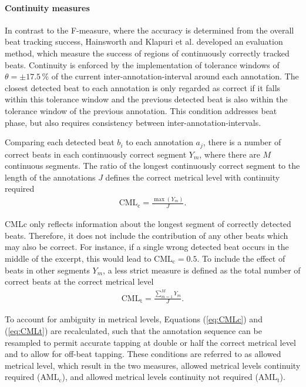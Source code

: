 \documentclass{scrartcl}
\begin{document}
\paragraph{Continuity measures} 
In contrast to the F-measure, where the accuracy is determined from the overall beat tracking success, Hainsworth \cite{Hainsworth2004b} and Klapuri et al. \cite{Klapuri2006} developed an evaluation method, which measure the success of regions of continuously correctly tracked beats. Continuity is enforced by the implementation of tolerance windows of $\theta  = \pm 17.5\, \%$ of the current inter-annotation-interval around each annotation. The closest detected beat to each annotation is only regarded as correct if it falls within this tolerance window and the previous detected beat is also within the tolerance window of the previous annotation. This condition addresses beat phase, but also requires consistency between inter-annotation-intervals. 

Comparing each detected beat $b_i$ to each annotation $a_j$, there is a number of correct beats in each continuously correct segment $Y_m$, where there are $M$ continuous segments. The ratio of the longest continuously correct segment to the length of the annotations $J$ defines the correct metrical level with continuity required
\begin{align}
\label{eq:CMLc}
\text{CML}_\text{c} = \frac{\max(Y_m)}{J}.
\end{align} 

CMLc only reflects information about the longest segment of correctly detected beats. Therefore, it does not include the contribution of any other beats which may also be correct. For instance, if a single wrong detected beat occurs in the middle of the excerpt, this would lead to $\text{CML}_\text{c} = 0.5$. To include the effect of beats in other segments $Y_m$, a less strict measure is defined as the total number of correct beats at the correct metrical level
\begin{align}
\label{eq:CMLt}
\text{CML}_\text{t} = \frac{\sum_{m=1}^MY_m}{J}.
\end{align} 

To account for ambiguity in metrical levels, Equations (\ref{eq:CMLc}) and (\ref{eq:CMLt}) are recalculated, such that the annotation sequence can be resampled to permit accurate tapping at double or half the correct metrical level and to allow for off-beat tapping. These conditions are referred to as allowed metrical level, which result in the two measures, allowed metrical levels continuity required ($\text{AML}_\text{c}$), and allowed metrical levels continuity not required ($\text{AML}_\text{t}$). 
\end{document}
